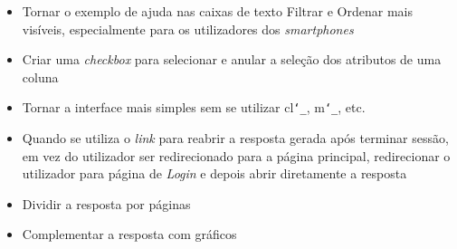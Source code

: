 \documentclass[11pt,twoside,a4paper]{report}
\begin{document}
\begin{itemize}
	\item Tornar o exemplo de ajuda nas caixas de texto Filtrar e Ordenar mais visíveis, especialmente para os utilizadores dos \textit{smartphones}
	\item Criar uma \textit{checkbox} para selecionar e anular a seleção dos atributos de uma coluna
	\item Tornar a interface mais simples sem se utilizar cl\texttt{\char`_}, m\texttt{\char`_}, etc.
	\item Quando se utiliza o \textit{link} para reabrir a resposta gerada após terminar sessão, em vez do utilizador ser redirecionado para a página principal, redirecionar o utilizador para página de \textit{Login} e depois abrir diretamente a resposta
	\item Dividir a resposta por páginas
	\item Complementar a resposta com gráficos
\end{itemize}

\newpage
\end{document}
